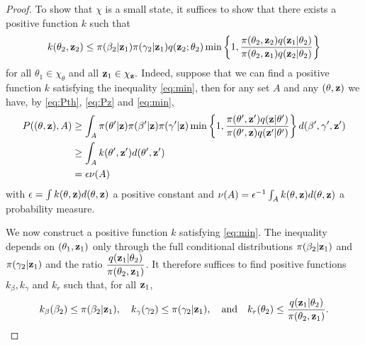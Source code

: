 \documentclass[11pt]{article}
\begin{document}
\begin{proof}
		To show that $\chi$ is a small state, it suffices to show that there exists a positive function $k$ such that
		\begin{equation}
		    \label{eq:min}
		    k(\theta_2, \mathbf{z}_2) \le \pi(\beta_2 | \mathbf{z}_1) \pi(\gamma_2 | \mathbf{z}_1) q(\mathbf{z}_2; \theta_2) \min\left\lbrace 1, \dfrac{\pi(\theta_2, \mathbf{z}_2)q(\mathbf{z}_1| \theta_2)}{\pi(\theta_2, \mathbf{z}_1)q(\mathbf{z}_2|\theta_2)} \right\rbrace
		\end{equation}
		for all $\theta_1 \in \chi_\theta$ and all $\mathbf{z}_1 \in \chi_{\mathbf{z}}.$
		Indeed, suppose that we can find a positive function $k$ satisfying the inequality \eqref{eq:min}, then for any set $A$ and any $(\theta, \mathbf{z})$ we have, by \eqref{eq:Pth}, \eqref{eq:Pz} and \eqref{eq:min},
		\begin{align*}
		    P((\theta, \mathbf{z}), A)
		    & \ge \int_A \pi(\theta' | \mathbf{z}) \pi(\beta' | \mathbf{z}) \pi(\gamma' | \mathbf{z}) \min\left\lbrace 1, \dfrac{\pi(\theta', \mathbf{z}')q(\mathbf{z}| \theta')}{\pi(\theta', \mathbf{z})q(\mathbf{z}'|\theta')} \right\rbrace d(\beta', \gamma', \mathbf{z}') \\
		    & \ge \int_A k(\theta', \mathbf{z}') d(\theta', \mathbf{z}') \\
		    & = \epsilon \nu(A)
		\end{align*}
		with $\epsilon = \int k(\theta, \mathbf{z}) d(\theta, \mathbf{z})$ a positive constant and $\nu(A) = \epsilon^{-1} \int_A k(\theta, \mathbf{z}) d(\theta, \mathbf{z})$ a probability measure. 
		
		We now construct a positive function $k$ satisfying \eqref{eq:min}. The inequality depends on $(\theta_1, \mathbf{z}_1)$ only through the full conditional distributions $\pi(\beta_2 | \mathbf{z}_1)$ and $\pi(\gamma_2 | \mathbf{z}_1)$ and the ratio $\dfrac{q(\mathbf{z}_1| \theta_2)}{\pi(\theta_2, \mathbf{z}_1)}$.
		It therefore suffices to find positive functions $k_\beta, k_\gamma$ and $k_r$ such that, for all $\mathbf{z}_1$,
		$$k_\beta(\beta_2) \le \pi(\beta_2 | \mathbf{z}_1),
		\quad k_\gamma(\gamma_2) \le \pi(\gamma_2 | \mathbf{z}_1),
		\quad \text{and} \quad k_r(\theta_2) \le \dfrac{q(\mathbf{z}_1|\theta_2)}{\pi(\theta_2, \mathbf{z}_1)}.$$
		

\end{proof}
\end{document}
